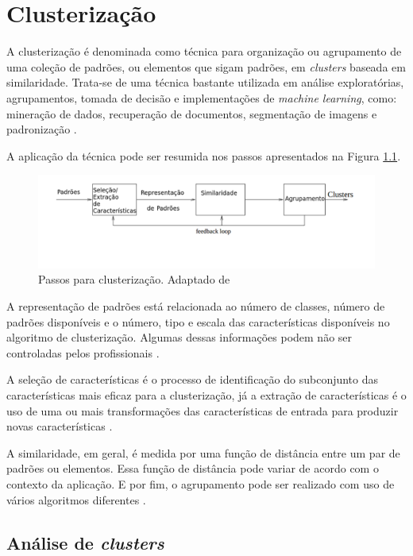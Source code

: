 \chapter{Clusterização} \label{cap:clusterizacao}

A clusterização é denominada como técnica para organização ou agrupamento de uma coleção de padrões, ou elementos que sigam padrões, em \textit{clusters} baseada em similaridade.
Trata-se de uma técnica bastante utilizada em análise exploratórias, agrupamentos, tomada de decisão e implementações de \textit{machine learning}, como:
mineração de dados, recuperação de documentos, segmentação de imagens e padronização \cite{clustering_review}.

A aplicação da técnica pode ser resumida nos passos apresentados na Figura \ref{fig:tasks_clustering}.

\begin{figure}[h!]
\centering
\includegraphics[scale=0.6]{figuras/tasks_clustering.png}
\caption{Passos para clusterização. Adaptado de }
\label{fig:tasks_clustering}
\end{figure}

A representação de padrões está relacionada ao número de classes, número de padrões disponíveis e o número, tipo e escala
das características disponíveis no algoritmo de clusterização. Algumas dessas informações podem não ser controladas pelos
profissionais \cite{clustering_review}.

A seleção de características é o processo de identificação do subconjunto das características mais eficaz para a clusterização, já a extração
de características é o uso de uma ou mais transformações das características de entrada para produzir novas características \cite{clustering_review}.

A similaridade, em geral, é medida por uma função de distância entre um par de padrões ou elementos. Essa função de distância pode variar
de acordo com o contexto da aplicação. E por fim, o agrupamento pode ser realizado com uso de vários algoritmos diferentes \cite{clustering_review}.

\section{Análise de \textit{clusters}}

